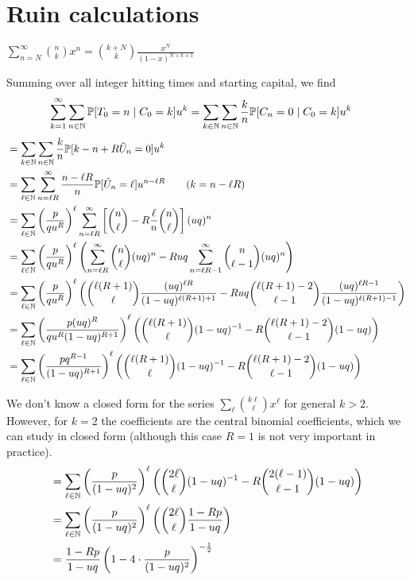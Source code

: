 \section{Ruin calculations}

\begin{lemma}

  $\sum_{n=N}^\infty { n\choose k } x^n = {k+N \choose k} \frac{x^N}{(1-x)^{N+k+1}}$

\end{lemma}

Summing over all integer hitting times and starting capital, we find
\begin{align*}
  \sum_{k=1}^\infty\sum_{n\in\mathbb{N}} \mathbb{P}[T_0 = n\mid C_0=k]u^k &= \sum_{k\in\mathbb{N}}\sum_{n\in\mathbb{N}} \frac{k}{n} \mathbb{P}[C_n = 0\mid C_0=k]u^k 
\end{align*}
\begin{align*}
  &= \sum_{k\in\mathbb{N}}\sum_{n\in\mathbb{N}} \frac{k}{n} \mathbb{P}[k - n + R\tilde{U}_n = 0]u^k \\
  &= \sum_{\ell\in\mathbb{N}}\sum_{n=\ell R}^\infty \frac{n-\ell R}{n} \mathbb{P}[\tilde{U}_n = \ell]u^{n-\ell R}   \qquad (k=n-\ell R)\\
  &= \sum_{\ell\in\mathbb{N}} \left( \frac{p}{qu^R} \right)^\ell \sum_{n=\ell R}^\infty \left[ 
    {n\choose \ell} - R \frac{\ell}{n} {n\choose \ell} 
  \right](uq)^n \\
  &= \sum_{\ell\in\mathbb{N}} \left( \frac{p}{qu^R} \right)^\ell 
  \left( 
    \sum_{n=\ell R}^\infty {n\choose \ell} (uq)^n - 
    Ruq \sum_{n=\ell R - 1}^\infty {n\choose \ell-1} (uq)^n
  \right) \\
  &= \sum_{\ell\in\mathbb{N}} \left( 
    \frac{p}{qu^R} 
  \right)^\ell 
  \left(
    {\ell(R+1) \choose \ell} \frac{ (uq)^{\ell R} } {(1-uq)^{\ell(R+1)+1} } - 
    Ruq {\ell(R+1)-2 \choose \ell - 1} \frac { (uq)^{\ell R-1} } { (1-uq)^{\ell(R+1) -1} }
  \right) \\
  &= \sum_{\ell\in\mathbb{N}} \left( 
    \frac{p(uq)^R}{qu^R(1-uq)^{R+1}} 
  \right)^\ell 
  \left(
    {\ell(R+1) \choose \ell} (1-uq)^{-1} - 
    R {\ell(R+1)-2 \choose \ell - 1} (1-uq)
  \right)  \\
  &= \sum_{\ell\in\mathbb{N}} \left( 
    \frac{pq^{R-1}}{(1-uq)^{R+1}} 
  \right)^\ell 
  \left(
    {\ell(R+1) \choose \ell} (1-uq)^{-1} - 
    R {\ell(R+1)-2 \choose \ell - 1} (1-uq)
  \right)
\end{align*}

We don't know a closed form for the series $\sum_\ell { k\ell \choose \ell }x^\ell $ for general $k>2$.
%
However, for $k=2$ the coefficients are the central binomial coefficients, which we can study in closed form (although this case $R=1$ is not very important in practice).
%
\begin{align*}
  &= \sum_{\ell\in\mathbb{N}} \left( 
    \frac{p}{(1-uq)^{2}} 
  \right)^\ell 
  \left(
    {2\ell \choose \ell} (1-uq)^{-1} - 
    R {2(\ell-1) \choose \ell - 1} (1-uq)
  \right) \\
  &= \sum_{\ell\in\mathbb{N}} \left( 
    \frac{p}{(1-uq)^{2}} 
  \right)^\ell 
  \left(
    {2\ell \choose \ell} \frac{1-Rp}{1-uq}
  \right) \\
  &= \frac{1-Rp}{1-uq}\left(
    1 - 4\cdot \frac{p}{(1-uq)^{2}}
  \right)^{-\frac{1}{2}} 
\end{align*}

